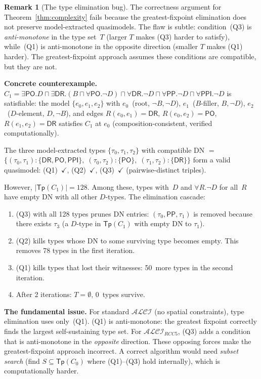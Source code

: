 \documentclass[a4paper,11pt]{article}
\theoremstyle{definition}
\newtheorem{remark}[theorem]{Remark}
\newcommand{\ALCI}{\ensuremath{\mathcal{ALCI}}}
\newcommand{\ALCIRCC}[1]{\ensuremath{\mathcal{ALCI}_{\mathit{RCC#1}}}}
\newcommand{\DR}{\ensuremath{\mathsf{DR}}}
\newcommand{\PO}{\ensuremath{\mathsf{PO}}}
\newcommand{\PP}{\ensuremath{\mathsf{PP}}}
\newcommand{\PPI}{\ensuremath{\mathsf{PPI}}}
\newcommand{\Tp}{\ensuremath{\mathsf{Tp}}}
\begin{document}
\begin{remark}[The type elimination bug]
\label{rem:type-elim-bug}
The correctness argument for Theorem~\ref{thm:complexity} fails because
the greatest-fixpoint elimination does not preserve model-extracted
quasimodels.  The flaw is subtle: condition~(Q3) is
\emph{anti-monotone} in the type set~$T$ (larger $T$ makes (Q3)
harder to satisfy), while~(Q1) is anti-monotone in the opposite
direction (smaller $T$ makes (Q1) harder).  The greatest-fixpoint
approach assumes these conditions are compatible, but they are not.

\textbf{Concrete counterexample.}\;
$C_1 = \exists \PO.D \sqcap \exists \DR.(B \sqcap \forall \PO.\neg D)
\sqcap \forall \DR.\neg D \sqcap \forall \PP.\neg D \sqcap \forall
\PPI.\neg D$
is satisfiable: the model $\{e_0, e_1, e_2\}$ with $e_0$~(root,
$\neg B, \neg D$), $e_1$~($B$-filler, $B, \neg D$), $e_2$~($D$-element,
$D, \neg B$), and edges $R(e_0, e_1) = \DR$, $R(e_0, e_2) = \PO$,
$R(e_1, e_2) = \DR$ satisfies $C_1$ at $e_0$ (composition-consistent,
verified computationally).

The three model-extracted types $\{\tau_0, \tau_1, \tau_2\}$ with
compatible DN $=$ $\{(\tau_0, \tau_1): \{\DR, \PO, \PPI\},\;
(\tau_0, \tau_2): \{\PO\},\; (\tau_1, \tau_2): \{\DR\}\}$ form a
valid quasimodel: (Q1)~$\checkmark$, (Q2)~$\checkmark$,
(Q3)~$\checkmark$ (pairwise-distinct triples).

However, $|\Tp(C_1)| = 128$.  Among these, types with~$D$ and
$\forall R.\neg D$ for all~$R$ have empty DN with all other $D$-types.
The elimination cascade:
\begin{enumerate}[nosep]
  \item (Q3) with all 128 types prunes DN entries: $(\tau_0, \PP,
    \tau_1)$ is removed because there exists $\tau_3$ (a $D$-type
    in $\Tp(C_1)$ with empty DN to $\tau_1$).
  \item (Q2) kills types whose DN to some surviving type becomes
    empty.  This removes 78 types in the first iteration.
  \item (Q1) kills types that lost their witnesses: 50~more types
    in the second iteration.
  \item After 2 iterations: $T = \emptyset$, 0~types survive.
\end{enumerate}

\textbf{The fundamental issue.}\;
For standard $\ALCI$ (no spatial constraints), type elimination uses
only~(Q1).  (Q1) is anti-monotone: the greatest fixpoint correctly
finds the largest self-sustaining type set.  For $\ALCIRCC{5}$,
(Q3) adds a condition that is anti-monotone in the \emph{opposite}
direction.  These opposing forces make the greatest-fixpoint approach
incorrect.  A correct algorithm would need \emph{subset search}
(find $S \subseteq \Tp(C_0)$ where (Q1)--(Q3) hold internally),
which is computationally harder.
\end{remark}
\end{document}
